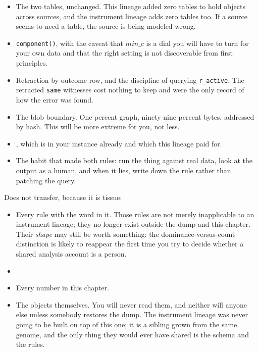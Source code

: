 \begin{itemize}
  \item The two tables, unchanged. This lineage added zero tables to hold \labLineageObjects{} objects across \labLineageSourceCount{} sources, and the instrument lineage adds zero tables too. If a source seems to need a table, the source is being modeled wrong.
  \item \texttt{component()}, with the caveat that $min\_c$ is a dial you will have to turn for your own data and that the right setting is not discoverable from first principles.
  \item Retraction by outcome row, and the discipline of querying \texttt{r\_active}. The \labLineageSameRetracted{} retracted \texttt{same} witnesses cost nothing to keep and were the only record of how the \labLineageTissueRuleName{} error was found.
  \item The blob boundary. One percent graph, ninety-nine percent bytes, addressed by hash. This will be more extreme for you, not less.
  \item {}, which is in your instance already and which this lineage paid for.
  \item The habit that made both rules: run the thing against real data, look at the output as a human, and when it lies, write down the rule rather than patching the query.
\end{itemize}

Does not transfer, because it is tissue:

\begin{itemize}
  \item Every rule with the word \labLineageTissueRuleWord{} in it. Those rules are not merely inapplicable to an instrument lineage; they no longer exist outside the dump and this chapter. Their \emph{shape} may still be worth something: the dominance-versus-count distinction is likely to reappear the first time you try to decide whether a shared analysis account is a person.
  \item \labLineageCoauthorJoin{}
  \item Every number in this chapter.
  \item The \labLineageObjects{} objects themselves. You will never read them, and neither will anyone else unless somebody restores the dump. The instrument lineage was never going to be built on top of this one; it is a sibling grown from the same genome, and the only thing they would ever have shared is the schema and the rules.
\end{itemize}

